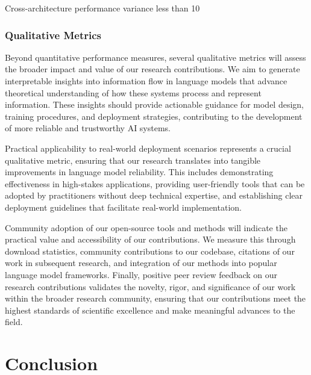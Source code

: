 \documentclass[11pt, oneside]{book}
\theoremstyle{plain}
\theoremstyle{definition}
\theoremstyle{remark}
\begin{document}
Cross-architecture performance variance less than 10%

\subsection{Qualitative Metrics}

Beyond quantitative performance measures, several qualitative metrics will assess the broader impact and value of our research contributions. We aim to generate interpretable insights into information flow in language models that advance theoretical understanding of how these systems process and represent information. These insights should provide actionable guidance for model design, training procedures, and deployment strategies, contributing to the development of more reliable and trustworthy AI systems.

Practical applicability to real-world deployment scenarios represents a crucial qualitative metric, ensuring that our research translates into tangible improvements in language model reliability. This includes demonstrating effectiveness in high-stakes applications, providing user-friendly tools that can be adopted by practitioners without deep technical expertise, and establishing clear deployment guidelines that facilitate real-world implementation.

Community adoption of our open-source tools and methods will indicate the practical value and accessibility of our contributions. We measure this through download statistics, community contributions to our codebase, citations of our work in subsequent research, and integration of our methods into popular language model frameworks. Finally, positive peer review feedback on our research contributions validates the novelty, rigor, and significance of our work within the broader research community, ensuring that our contributions meet the highest standards of scientific excellence and make meaningful advances to the field.




\chapter{Conclusion}
\end{document}
